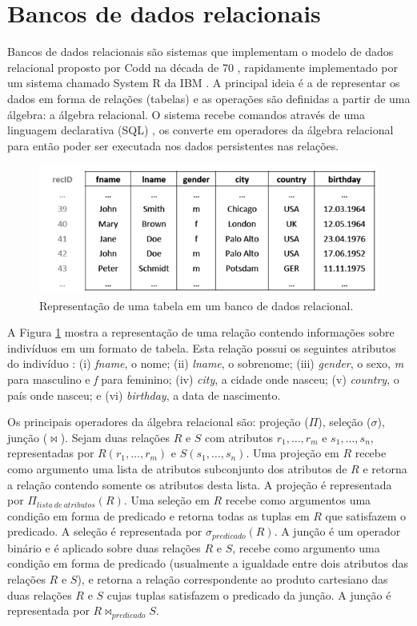 \section{Bancos de dados relacionais}
\label{sec:relacional}

Bancos de dados relacionais são sistemas que implementam o modelo de dados
relacional proposto por Codd na década de 70 \cite{Codd1970}, rapidamente
implementado por um sistema chamado System R da IBM \cite{Astrahan1976}.
A principal ideia é a de representar os dados em forma de relações (tabelas)
e as operações são definidas a partir de uma álgebra: a álgebra relacional.
O sistema recebe comandos através de uma linguagem declarativa (SQL) 
\cite{Chamberlin1974}, os converte em operadores da álgebra relacional
para então poder ser executada nos dados persistentes nas relações.

\begin{figure}
        \centering
        \includegraphics[width=\linewidth]{./colunar_repr_tabela.png}
        \caption{Representação de uma tabela em um banco de dados relacional.}
        \label{fig:tabular}
\end{figure}

A Figura \ref{fig:tabular} mostra a representação de uma relação contendo 
informações sobre indivíduos em um formato de tabela. Esta relação possui
os seguintes atributos do indivíduo : (i) \emph{fname}, o nome; (ii) 
\emph{lname}, o sobrenome; (iii) \emph{gender}, o sexo, \emph{m} para 
masculino e \emph{f} para feminino; (iv) \emph{city},
a cidade onde nasceu; (v) \emph{country}, o país onde nasceu; e 
(vi) \emph{birthday}, a data de nascimento.

Os principais operadores da álgebra relacional são: projeção ($\Pi$),
seleção ($\sigma$), junção ($\bowtie$). Sejam duas relações $R$ e $S$
com atributos $r_1, \ldots, r_m$ e $s_1, \ldots, s_n$, representadas
por $R(r_1, \ldots, r_m)$ e $S(s_1, \ldots, s_n)$. Uma projeção em $R$
recebe como argumento uma lista de atributos subconjunto dos atributos
de $R$ e retorna a relação contendo somente os atributos desta lista.
A projeção é representada por $\Pi_{lista~de~atributos}(R)$. Uma seleção
em $R$ recebe como argumentos uma condição em forma de predicado e 
retorna todas as tuplas em $R$ que satisfazem o predicado. A seleção 
é representada por $\sigma_{predicado} (R)$. A junção é um operador
binário e é aplicado sobre duas relações $R$ e $S$, recebe como argumento
uma condição em forma de predicado (usualmente a igualdade entre dois
atributos das relações $R$ e $S$), e retorna a relação correspondente
ao produto cartesiano das duas relações $R$ e $S$ cujas tuplas satisfazem
o predicado da junção. A junção é representada por $R \bowtie_{predicado} S$. 

